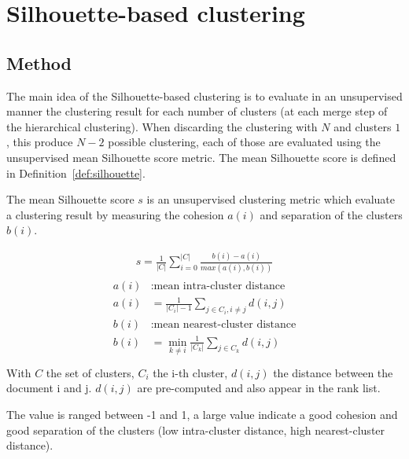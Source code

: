 \section{Silhouette-based clustering\label{sec:silhouette-based_clustering}}

\subsection{Method}

The main idea of the Silhouette-based clustering is to evaluate in an unsupervised manner the clustering result for each number of clusters (at each merge step of the hierarchical clustering).
When discarding the clustering with $N$ and clusters $1$, this produce $N - 2$ possible clustering, each of those are evaluated using the unsupervised mean Silhouette score metric.
The mean Silhouette score is defined in Definition~\ref{def:silhouette}.

\begin{definition}
  \label{def:silhouette}
  The mean Silhouette score $s$ is an unsupervised clustering metric which evaluate a clustering result by measuring the cohesion $a(i)$ and separation of the clusters $b(i)$.

  \begin{gather*}
    s = \frac{1}{|C|} \sum_{i = 0}^{|C|} \frac{b(i) - a(i)}{max(a(i), b(i))}
  \end{gather*}
  \begin{gather*}
    \begin{split}
      a(i)&: \text{mean intra-cluster distance} \\
      a(i)& = \frac{1}{|C_i| - 1} \sum_{j \in C_i, i\neq j} d(i, j) \\
      b(i)&: \text{mean nearest-cluster distance} \\
      b(i)& = \min_{k\neq i} \frac{1}{|C_k|} \sum_{j \in C_k} d(i, j) \\
    \end{split}
  \end{gather*}
  With $C$ the set of clusters, $C_i$ the i-th cluster, $d(i, j)$ the distance between the document i and j.
  $d(i, j)$ are pre-computed and also appear in the rank list.

  The value is ranged between -1 and 1, a large value indicate a good cohesion and good separation of the clusters (low intra-cluster distance, high nearest-cluster distance).
\end{definition}

